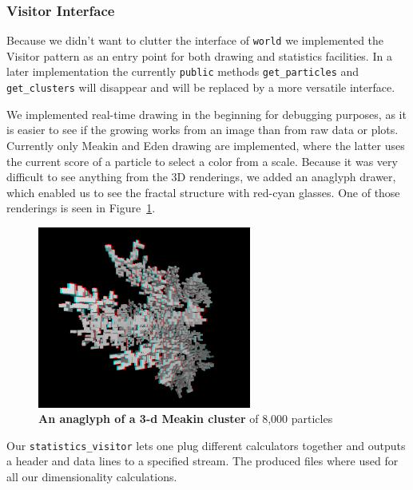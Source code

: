 \documentclass[twocolumn,10pt]{scrartcl}
\begin{document}
            \subsubsection{Visitor Interface}
                Because we didn't want to clutter the interface of \lstinline'world' we implemented the Visitor
                pattern\cite{bib-visitor} as an entry point for both drawing and statistics facilities. In a later
                implementation the currently \lstinline'public' methods \lstinline'get_particles' and
                \lstinline'get_clusters' will disappear and will be replaced by a more versatile interface.

                We implemented real-time drawing in the beginning for debugging purposes, as it is easier to see if the
                growing works from an image than from raw data or plots. Currently only Meakin and Eden drawing are
                implemented, where the latter uses the current score of a particle to select a color from a scale.
                Because it was very difficult to see anything from the 3D renderings, we added an anaglyph drawer, which
                enabled us to see the fractal structure with red-cyan glasses. One of those renderings is seen in
                Figure~\ref{fig-anaglyph}.
                \begin{figure}
                    \center
                    \includegraphics[width=7cm]{img/anaglyph.png}
                    \caption[An anaglyph of a 3-d Meakin cluster]
                        {\small\textbf{An anaglyph of a 3-d Meakin cluster} of 8,000 particles}
                    \label{fig-anaglyph}
                \end{figure}

                Our \lstinline'statistics_visitor' lets one plug different calculators together and outputs a header and
                data lines to a specified stream. The produced files where used for all our dimensionality calculations.
\end{document}
